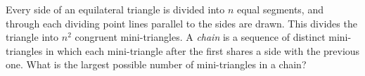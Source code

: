 Every side of an equilateral triangle is divided into $n$ equal segments, and through each dividing point lines parallel to the sides are drawn. This divides the triangle into $n^2$ congruent mini-triangles. A \emph{chain} is a sequence of distinct mini-triangles in which each mini-triangle after the first shares a side with the previous one. What is the largest possible number of mini-triangles in a chain?
